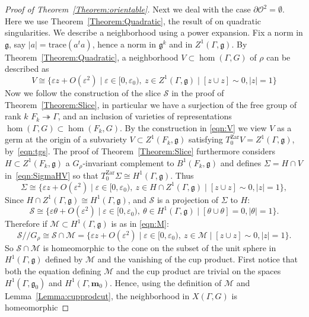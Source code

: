\documentclass[a4paper,11pt]{article}
\begin{document}
\begin{proof}[Proof of Theorem~\ref{Theorem:orientable}]
Next we deal with the case  $\partial\mathcal O^2=\emptyset$. 
Here we use Theorem~\ref{Theorem:Quadratic}, 
the result of \cite{GoldmanMaryland,GoldmanMillson,Simpson} on quadratic singularities.
We describe a neighborhood using a power expansion. 
Fix a norm in $\mathfrak g$, say 
$|a|=\mathrm{trace}(a^t a)$, hence a norm in $\mathfrak g^k$ and in
$Z^1(\Gamma, \mathfrak g)$.
By Theorem~\ref{Theorem:Quadratic}, a neighborhood   $V\subset \hom(\Gamma, G)$ of $\rho$  can be described as
$$
V\cong\{ \varepsilon z+ O(\varepsilon^2)\mid  
\varepsilon\in [0,\varepsilon_0), \
z\in Z^1(\Gamma, \mathfrak g)\mid  
[z\cup z]\sim 0, |z| = 1\}
$$
Now we follow the construction of the slice $\mathcal S$ in the 
proof of Theorem~\ref{Theorem:Slice}, in particular we have a surjection of the 
free group of rank $k$ $F_k\twoheadrightarrow \Gamma$, and an
inclusion of varieties of representations
$\hom(\Gamma, G)\subset \hom(F_k, G)$.
By the construction in  
\eqref{eqn:V} we view $V$  as a germ at the origin of a subvariety 
$V\subset Z^1(F_k,\mathfrak g)$ satisfying 
$T_0^{\mathrm{Zar}} V= Z^1(\Gamma,\mathfrak{g})$, 
by~\eqref{eqn:tgs}.  The proof of 
Theorem~\ref{Theorem:Slice} furthermore considers $H\subset
Z^1(F_k,\mathfrak g)$ a $G_\rho$-invariant complement to 
$B^1(F_k,\mathfrak g)$ and defines $\Sigma=H\cap V$
in~\eqref{eqn:SigmaHV} so that $T_0^{\mathrm{Zar}}\Sigma
\cong H^1(\Gamma, \mathfrak{g})$.
Thus
$$
 \Sigma \cong\{ \varepsilon z+ O(\varepsilon^2)\mid  
\varepsilon\in [0,\varepsilon_0), \
z \in H\cap Z^1(\Gamma,\mathfrak g)
\mid 
[z\cup z]\sim 0, |z | = 1\},
$$
Since $H\cap Z^1(\Gamma,\mathfrak g)\cong H^1(\Gamma,\mathfrak g)$,
and $\mathcal S$ is a projection of $\Sigma$ to $H$:
$$
\mathcal S \cong \{ \varepsilon \theta+ O(\varepsilon^2)\mid  
\varepsilon\in [0,\varepsilon_0), \
\theta \in H^1(\Gamma,\mathfrak g)
\mid 
[\theta\cup \theta]= 0, |\theta | = 1\}.
$$
Therefore if $\mathcal M\subset H^1(\Gamma, \mathfrak{g})$
is as in \eqref{eqn:M}:
$$\mathcal S/\!/G_\rho \cong 
\mathcal S\cap\mathcal M=\{ \varepsilon z+ O(\varepsilon^2)\mid  
\varepsilon\in [0,\varepsilon_0), \
z\in \mathcal M \mid
[z\cup z]\sim 0, |z | = 1\}.
$$
So $\mathcal S\cap\mathcal M$ is homeomorphic to the cone on
the subset of the unit sphere in $ H^1(\Gamma, \mathfrak g)$ defined by $\mathcal M$ and
the vanishing of the cup product.  First notice that both the equation defining $\mathcal M$ and the cup product are trivial on the spaces
$H^1(\Gamma, \mathfrak{g}_0)$
and $H^1(\Gamma, \mathbf{m}_0)$. 
Hence, using the definition of $\mathcal M$ and Lemma~\ref{Lemma:cupprodcut}, the neighborhood in $X(\Gamma, G)$ is homeomorphic

\end{proof}
\end{document}
